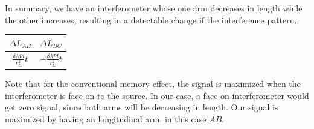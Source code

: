 \documentclass[aps,showpacs,twocolumn,floats,prd,superscriptaddress,nofootinbib]{revtex4-1}
\begin{document}
In summary, we have an interferometer whose one arm decreases in length while the other increases, resulting in a detectable change if the interference pattern. 
\begin{center}
\begin{tabular}{| c | c |} 
\hline
$\Delta L_{AB}$ &  $  \Delta L_{BC} $  \\   \hline 
$\frac{\delta M d}{r_E^2} t$ & $ -\frac{\delta M d}{r_E^2} t$  \\ 
\hline 
\end{tabular}
\end{center}
Note that for the conventional memory effect, the signal is maximized when the interferometer is face-on to the source. In our case, a face-on interferometer would get zero signal, since both arms will be decreasing in length. Our signal is maximized by having an longitudinal arm, in this case $AB$.
\end{document}
